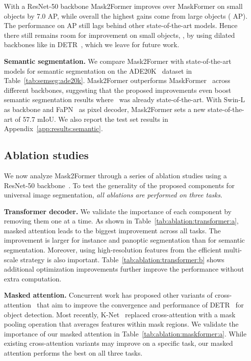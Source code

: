 \documentclass[10pt,twocolumn,letterpaper]{article}
\newcommand{\modelname}{Mask2Former\xspace}
\newcommand{\tabref}[1]{Table~\ref{#1}}
\newcommand{\appref}[1]{Appendix~\ref{#1}}
\begin{document}
With a ResNet-50 backbone \modelname  improves over MaskFormer on small objects by 7.0 AP, while overall the highest gains come from large objects ( AP). The performance on AP still lags behind other state-of-the-art models.
Hence there still remains room for improvement on small objects, \eg, by using dilated backbones like in DETR~\cite{detr}, which we leave for future work.

\noindent\textbf{Semantic segmentation.} We compare \modelname with state-of-the-art models for semantic segmentation on the ADE20K~\cite{zhou2017ade20k} dataset in \tabref{tab:semseg:ade20k}. \modelname outperforms MaskFormer~\cite{cheng2021maskformer} across different backbones, suggesting that the proposed improvements even boost semantic segmentation results where~\cite{cheng2021maskformer} was already state-of-the-art. With Swin-L as  backbone and FaPN~\cite{fapn} as  pixel decoder, \modelname sets a new state-of-the-art of 57.7 mIoU. We also report the test set results in \appref{app:results:semantic}.


\subsection{Ablation studies}
We now analyze \modelname through a series of ablation studies using a ResNet-50 backbone~\cite{he2016deep}. To test the generality of the proposed components  for universal image segmentation, \emph{all ablations are performed on three tasks}.





\noindent\textbf{Transformer decoder.}
We validate the importance of each component by removing them one at a time. As shown in \tabref{tab:ablation:transformer:a}, masked attention leads to the biggest improvement across all tasks. The improvement is larger for instance and panoptic segmentation
than for semantic segmentation. Moreover, using high-resolution features from the efficient multi-scale strategy is also important. \tabref{tab:ablation:transformer:b} shows additional optimization improvements further improve the performance without extra computation.

\noindent\textbf{Masked attention.}
Concurrent work has proposed other variants of cross-attention~\cite{gao2021smca,meng2021cdetr} that aim to improve the convergence and performance of DETR~\cite{detr} for object detection. Most recently, K-Net~\cite{zhang2021knet} replaced cross-attention with a mask pooling operation that averages features within mask regions. We validate the importance of our masked attention in \tabref{tab:ablation:maskformer:a}. While existing cross-attention variants may improve on a specific task, our masked attention performs the best on all three tasks.
\end{document}
